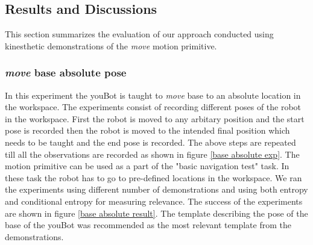 \subsection{Results and Discussions}
This section summarizes the evaluation of our approach conducted using 
kinesthetic demonstrations of the \textit{move} motion primitive.

\subsubsection{\textit{move} base absolute pose}
In this experiment the youBot is
taught to \textit{move} base to an absolute location in the workspace.
The experiments consist of recording different poses of the robot in the workspace.
First the robot is moved to any arbitary position and the start pose is recorded then 
the robot is moved to the intended final position which needs to be taught and the end 
pose is recorded. The above steps are repeated till all the observations are recorded as shown in figure \ref{base absolute exp}.
The motion primitive can be used as a part of the "basic navigation test" task. In these
task the robot has to go to pre-defined locations in the workspace.
We ran the experiments using different number of demonstrations and using both entropy 
and conditional entropy for measuring relevance. The success of the experiments are 
shown in figure \ref{base absolute result}. 
The template describing the pose of the base of the youBot was recommended as the most
relevant template from the demonstrations.


